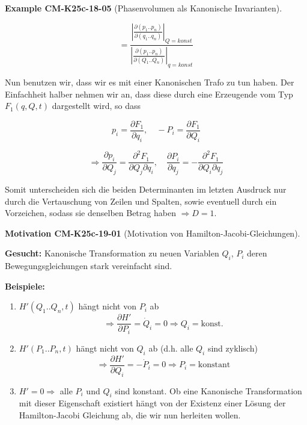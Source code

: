 \documentclass[10pt, letterpaper]{article}
\newcommand{\CustomHeading}[3]{%
  \par\medskip\noindent%
  \textbf{#1 #2} \textnormal{(#3)}.\enskip%
}
\newenvironment{EXA}[2]{\CustomHeading{Example}{#1}{#2}}{}
\newenvironment{MOT}[2]{\CustomHeading{Motivation}{#1}{#2}}{}
\begin{document}
\begin{EXA}{CM-K25c-18-05}{Phasenvolumen als Kanonische Invarianten}
\[
= \frac{\left|\frac{\partial(p_1..p_n)}{\partial(q_1..q_n)}\right|_{Q=konst}}{\left|\frac{\partial(p_1..p_n)}{\partial(Q_1..Q_n)}\right|_{q=konst}}
\]

Nun benutzen wir, dass wir es mit einer Kanonischen Trafo zu tun haben. Der Einfachheit halber nehmen wir an, dass diese durch eine Erzeugende vom Typ $F_1(q,Q,t)$ dargestellt wird, so dass

\[
p_i = \frac{\partial F_1}{\partial q_i}, \quad -P_i = \frac{\partial F_1}{\partial Q_i}
\]

\[
\Rightarrow \frac{\partial p_i}{\partial Q_j} = \frac{\partial^2 F_1}{\partial Q_j \partial q_i}, \quad \frac{\partial P_i}{\partial q_j} = -\frac{\partial^2 F_1}{\partial Q_i \partial q_j}
\]

Somit unterscheiden sich die beiden Determinanten im letzten Ausdruck nur durch die Vertauschung von Zeilen und Spalten, sowie eventuell durch ein Vorzeichen, sodass sie denselben Betrag haben $\Rightarrow D = 1$.
\end{EXA}

\begin{MOT}{CM-K25c-19-01}{Motivation von Hamilton-Jacobi-Gleichungen}
\textbf{Gesucht:} Kanonische Transformation zu neuen Variablen $Q_i$, $P_i$ deren Bewegungsgleichungen stark vereinfacht sind.

\textbf{Beispiele:} 
\begin{enumerate}
\item $H'(Q_1..Q_n,t)$ hängt nicht von $P_i$ ab
\[\Rightarrow \frac{\partial H'}{\partial P_i} = \dot{Q}_i = 0 \Rightarrow Q_i = \text{konst.}\]

\item $H'(P_1..P_n,t)$ hängt nicht von $Q_i$ ab (d.h. alle $Q_i$ sind zyklisch)
\[\Rightarrow \frac{\partial H'}{\partial Q_i} = -\dot{P}_i = 0 \Rightarrow P_i = \text{konstant}\]

\item $H' = 0 \Rightarrow$ alle $P_i$ und $Q_i$ sind konstant. Ob eine Kanonische Transformation mit dieser Eigenschaft existiert hängt von der Existenz einer Lösung der Hamilton-Jacobi Gleichung ab, die wir nun herleiten wollen.
\end{enumerate}
\end{MOT}
\end{document}
